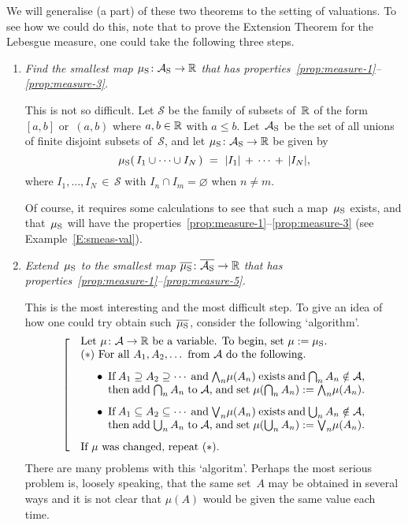 \documentclass[main.tex]{subfiles}
\begin{document}
We will generalise (a part) of these two theorems
to the setting of valuations.
To see how we could do this,
note that to prove
the Extension Theorem for the Lebesgue measure,
one could take the following three steps.
\begin{enumerate}
\item
\label{extension-step-1}
\emph{Find the smallest map $\mu_{\mathrm{S}}\colon \mathcal{A}_{\mathrm{S}}\rightarrow \mathbb{R}$
that has properties~\ref{prop:measure-1}--\ref{prop:measure-3}.}

This is not so difficult.
Let $\mathcal{S}$ be the family of subsets of~$\mathbb{R}$ of
the form~$[a,b]$ or~$(a,b)$ where $a,b\in \mathbb{R}$ with $a\leq b$.
Let~$\mathcal{A}_{\mathrm{S}}$ be the set of all unions
of finite disjoint subsets of~$\mathcal{S}$,
and let $\mu_{\mathrm{S}}\colon \mathcal{A}_{\mathrm{S}}\rightarrow \mathbb{R}$
be given by
\begin{equation*}
\Smu(\,I_1 \cup\dotsb\cup I_N\,) \ = \ |I_1| \,+\,\dotsb\,+\,|I_N|,
\end{equation*}
where $I_1,\dotsc,I_N\,\in\, \mathcal{S}$
with $I_n\cap I_m = \varnothing$ when $n\neq m$.

Of course, it requires some calculations
to see that such a map~$\mu_{\mathrm{S}}$ exists,
and that~$\mu_{\mathrm{S}}$ will have the 
properties~\ref{prop:measure-1}--\ref{prop:measure-3}
(see Example~\ref{E:smeas-val}).

\item
\label{extension-step-2}
\emph{Extend~$\mu_{\mathrm{S}}$
to the smallest map $\overline{\mu_{\mathrm{S}}}\colon\overline{\mathcal{A}_{\mathrm{S}}}\rightarrow\mathbb{R}$
that has properties~\ref{prop:measure-1}--\ref{prop:measure-5}.}

This is the most interesting and the most difficult step.
To give an idea of how one could try obtain such~$\overline{\mu_{\mathrm{S}}}$,
consider the following `algorithm'.
\begin{equation*}
\left[\quad
\begin{minipage}{.75\columnwidth}
Let $\mu\colon\mathcal{A} \ra \R$
be a variable. To begin, set $\mu \eqdf \Smu$.\\
$\mathbf{(*)}$ For all~$A_1,A_2,\dotsc$ from~$\mathcal{A}$ 
do the following.
\begin{enumerate}
\item[$\bullet$] If $A_1 \supseteq A_2 \supseteq \dotsb$
and  $\bw_n \mu(A_n)$ exists
and  $\bigcap_n A_n \notin \mathcal{A}$,\\
then add $\bigcap_n A_n$ to~$\mathcal{A}$,
and set $\mu(\bigcap_n A_n) \eqdf \bw_n \mu(A_n)$.
\item[$\bullet$] If $A_1 \subseteq A_2 \subseteq \dotsb$
and  $\bv_n \mu(A_n)$ exists
and  $\bigcup_n A_n \notin \mathcal{A}$,\\
then add $\bigcup_n A_n$ to~$\mathcal{A}$,
and set $\mu(\bigcup_n A_n) \eqdf \bv_n \mu(A_n)$.
\end{enumerate}
If~$\mu$ was changed, repeat~$\mathbf{(*)}$.
\end{minipage}
\right.
\end{equation*}
There are many problems with this `algoritm'.
Perhaps the most serious problem
is, loosely speaking, that the same set~$A$ may be obtained
in several ways
and it is not clear that
$\mu(A)$ would be given the same value each time.


\end{enumerate}
\end{document}
